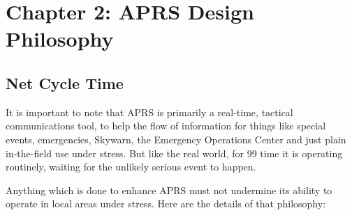 \chapter{Chapter 2: APRS Design Philosophy}


\section{Net Cycle Time}

It is important to note that APRS is primarily a real-time, tactical
communications tool, to help the flow of information for things like special
events, emergencies, Skywarn, the Emergency Operations Center and just
plain in-the-field use under stress. But like the real world, for 99%
time it is operating routinely, waiting for the unlikely serious event to
happen.

Anything which is done to enhance APRS must not undermine its ability to
operate in local areas under stress. Here are the details of that philosophy:

